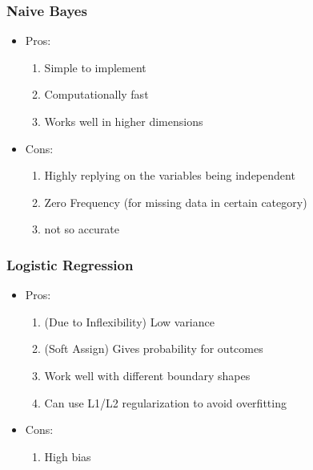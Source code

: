 \documentclass[12pt]{amsart}
\numberwithin{equation}{section}
\theoremstyle{plain}
\theoremstyle{definition}
\begin{document}
\subsubsection{Naive Bayes}

\begin{itemize}
\item Pros: 

\begin{enumerate}
\item Simple to implement
\item Computationally fast
\item Works well in higher dimensions
\end{enumerate}

\item Cons:

\begin{enumerate}
\item Highly replying on the variables being independent
\item Zero Frequency (for missing data in certain category)
\item not so accurate
\end{enumerate}

\end{itemize}

\subsubsection{Logistic Regression}

\begin{itemize}
\item Pros: 

\begin{enumerate}
\item (Due to Inflexibility) Low variance
\item (Soft Assign) Gives probability for outcomes
\item Work well with different boundary shapes
\item Can use L1/L2 regularization to avoid overfitting
\end{enumerate}

\item Cons:

\begin{enumerate}
\item High bias
\end{enumerate}

\end{itemize}
\end{document}

